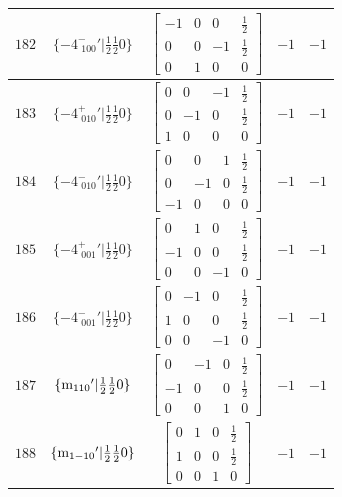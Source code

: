 \documentclass[fleqn,8pt]{jsarticle}
\begin{document}
\begin{longtable}{ccccc}
$ 182 $ & $ \{-4^{-}_{\,\,100}{}'|\frac{1}{2} \frac{1}{2} 0\} $ & $ \begin{bmatrix} -1 & 0 & 0 & \frac{1}{2} \\ 0 & 0 & -1 & \frac{1}{2} \\ 0 & 1 & 0 & 0 \end{bmatrix} $ & $ -1 $ & $ -1 $ \\ \hline
$ 183 $ & $ \{-4^{+}_{\,\,010}{}'|\frac{1}{2} \frac{1}{2} 0\} $ & $ \begin{bmatrix} 0 & 0 & -1 & \frac{1}{2} \\ 0 & -1 & 0 & \frac{1}{2} \\ 1 & 0 & 0 & 0 \end{bmatrix} $ & $ -1 $ & $ -1 $ \\ \hline
$ 184 $ & $ \{-4^{-}_{\,\,010}{}'|\frac{1}{2} \frac{1}{2} 0\} $ & $ \begin{bmatrix} 0 & 0 & 1 & \frac{1}{2} \\ 0 & -1 & 0 & \frac{1}{2} \\ -1 & 0 & 0 & 0 \end{bmatrix} $ & $ -1 $ & $ -1 $ \\ \hline
$ 185 $ & $ \{-4^{+}_{\,\,001}{}'|\frac{1}{2} \frac{1}{2} 0\} $ & $ \begin{bmatrix} 0 & 1 & 0 & \frac{1}{2} \\ -1 & 0 & 0 & \frac{1}{2} \\ 0 & 0 & -1 & 0 \end{bmatrix} $ & $ -1 $ & $ -1 $ \\ \hline
$ 186 $ & $ \{-4^{-}_{\,\,001}{}'|\frac{1}{2} \frac{1}{2} 0\} $ & $ \begin{bmatrix} 0 & -1 & 0 & \frac{1}{2} \\ 1 & 0 & 0 & \frac{1}{2} \\ 0 & 0 & -1 & 0 \end{bmatrix} $ & $ -1 $ & $ -1 $ \\ \hline
$ 187 $ & $ \{{\rm m}_{110}{}'|\frac{1}{2} \frac{1}{2} 0\} $ & $ \begin{bmatrix} 0 & -1 & 0 & \frac{1}{2} \\ -1 & 0 & 0 & \frac{1}{2} \\ 0 & 0 & 1 & 0 \end{bmatrix} $ & $ -1 $ & $ -1 $ \\ \hline
$ 188 $ & $ \{{\rm m}_{1-10}{}'|\frac{1}{2} \frac{1}{2} 0\} $ & $ \begin{bmatrix} 0 & 1 & 0 & \frac{1}{2} \\ 1 & 0 & 0 & \frac{1}{2} \\ 0 & 0 & 1 & 0 \end{bmatrix} $ & $ -1 $ & $ -1 $ \\ \hline

\end{longtable}
\end{document}
